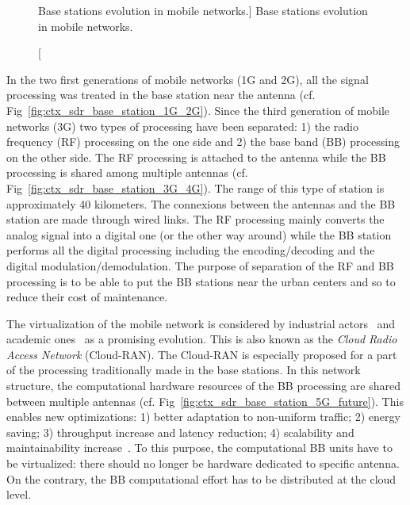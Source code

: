 \begin{figure}[htp]
  \centering
  \quad{}
  \quad{}
  \caption
    [Base stations evolution in mobile networks.]
    {Base stations evolution in mobile networks.}
  \label{fig:ctx_sdr_base_station}
\end{figure}

In the two first generations of mobile networks (1G and 2G), all the signal
processing was treated in the base station near the antenna (cf.
Fig~\ref{fig:ctx_sdr_base_station_1G_2G}). Since the third generation of mobile
networks (3G) two types of processing have been separated: 1) the radio
frequency (RF) processing on the one side and 2) the base band (BB) processing
on the other side. The RF processing is attached to the antenna while the BB
processing is shared among multiple antennas (cf.
Fig~\ref{fig:ctx_sdr_base_station_3G_4G}). The range of this type of station is
approximately 40 kilometers. The connexions between the antennas and the BB
station are made through wired links. The RF processing mainly converts the
analog signal into a digital one (or the other way around) while the BB station
performs all the digital processing including the encoding/decoding and the
digital modulation/demodulation. The purpose of separation of the RF and BB
processing is to be able to put the BB stations near the urban centers and so to
reduce their cost of maintenance.

The virtualization of the mobile network is considered by industrial
actors~\cite{Huawei2013,Ericsson2015} and academic ones~\cite{Wubben2014,
Rost2014,Checko2015a} as a promising evolution. This is also known as the
\emph{Cloud Radio Access Network} (Cloud-RAN). The Cloud-RAN is especially
proposed for a part of the processing traditionally made in the base stations.
In this network structure, the computational hardware resources of the BB
processing are shared between multiple antennas (cf.
Fig~\ref{fig:ctx_sdr_base_station_5G_future}). This enables new optimizations:
1) better adaptation to non-uniform traffic; 2) energy saving; 3) throughput
increase and latency reduction; 4) scalability and maintainability
increase~\cite{Checko2015a}. To this purpose, the computational BB units have to
be virtualized: there should no longer be hardware dedicated to specific
antenna. On the contrary, the BB computational effort has to be distributed at
the cloud level.

